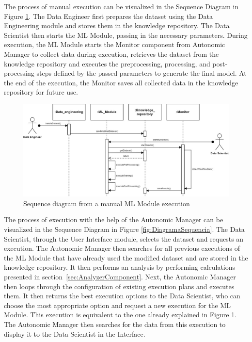 \documentclass[sigconf]{acmart}
\begin{document}
The process of manual execution can be visualized in the Sequence Diagram in Figure \ref{fig:DiagramaSequenciaModuloML}. The Data Engineer first prepares the dataset using the Data Engineering module and stores them in the knowledge repository. The Data Scientist then starts the ML Module, passing in the necessary parameters. During execution, the ML Module starts the Monitor component from Autonomic Manager to collect data during execution, retrieves the dataset from the knowledge repository and executes the preprocessing, processing, and post-processing steps defined by the passed parameters to generate the final model. At the end of the execution, the Monitor saves all collected data in the knowledge repository for future use.

\begin{figure}[h]
\centering
\includegraphics[scale=0.425]{images/Diagrama_Sequencia-manual-eng.jpg}
\caption{Sequence diagram from a manual ML Module execution}
\label{fig:DiagramaSequenciaModuloML}
\end{figure}

The process of execution with the help of the Autonomic Manager can be visualized in the Sequence Diagram in Figure \ref{fig:DiagramaSequencia}. The Data Scientist, through the User Interface module, selects the dataset and requests an execution. The Autonomic Manager then searches for all previous executions of the ML Module that have already used the modified dataset and are stored in the knowledge repository. It then performs an analysis by performing calculations presented in section~\ref{sec:AnalyzerComponent}. Next, the Autonomic Manager then loops through the configuration of existing execution plans and executes them. It then returns the best execution options to the Data Scientist, who can choose the most appropriate option and request a new execution for the ML Module. This execution is equivalent to the one already explained in Figure \ref{fig:DiagramaSequenciaModuloML}. The Autonomic Manager then searches for the data from this execution to display it to the Data Scientist in the Interface.
\end{document}
